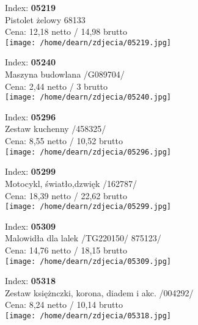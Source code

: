 {Index: \textbf{05219}\\
Pistolet żelowy 68133\\
Cena: 12,18 netto / 14,98 brutto\\
  \texttt{[image: /home/dearn/zdjecia/05219.jpg]}}\newline\newline

{Index: \textbf{05240}\\
Maszyna budowlana /G089704/\\
Cena: 2,44 netto / 3 brutto\\
  \texttt{[image: /home/dearn/zdjecia/05240.jpg]}}\newline\newline

{Index: \textbf{05296}\\
Zestaw kuchenny /458325/\\
Cena: 8,55 netto / 10,52 brutto\\
  \texttt{[image: /home/dearn/zdjecia/05296.jpg]}}\newline\newline

{Index: \textbf{05299}\\
Motocykl, światło,dzwięk /162787/\\
Cena: 18,39 netto / 22,62 brutto\\
  \texttt{[image: /home/dearn/zdjecia/05299.jpg]}}\newline\newline

{Index: \textbf{05309}\\
Malowidła dla lalek /TG220150/ 875123/\\
Cena: 14,76 netto / 18,15 brutto\\
  \texttt{[image: /home/dearn/zdjecia/05309.jpg]}}\newline\newline

{Index: \textbf{05318}\\
Zestaw księżnczki, korona, diadem i akc. /004292/\\
Cena: 8,24 netto / 10,14 brutto\\
  \texttt{[image: /home/dearn/zdjecia/05318.jpg]}}\newline\newline

